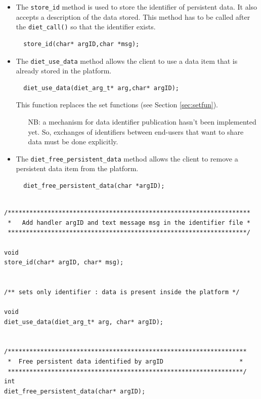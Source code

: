 \begin{itemize}
\item {The \texttt{store\_id} method} is used to store the
identifier of persistent data. It also accepts a description of
the data stored. This method has to be called after the
\texttt{diet\_call()} so that the identifier exists.
\begin{verbatim}
  store_id(char* argID,char *msg);
\end{verbatim}

\item The \texttt{diet\_use\_data} method allows the client to use a data
item that is already stored in the platform.
\begin{verbatim}
  diet_use_data(diet_arg_t* arg,char* argID);
\end{verbatim}
This function replaces the set functions (see Section \ref{sec:setfun}).



\begin{itemize}
\item[NB:] a mechanism for data identifier publication hasn't been 
implemented yet. So, exchanges of identifiers between end-users that
want to share data must be done explicitly.
\end{itemize}



\item {The \texttt{diet\_free\_persistent\_data} method} allows the
client to remove a persistent data item from the platform.
\begin{verbatim}
  diet_free_persistent_data(char *argID);
\end{verbatim}

\end{itemize}


{\footnotesize
\begin{verbatim}

/*******************************************************************
 *   Add handler argID and text message msg in the identifier file *
 ******************************************************************/

void 
store_id(char* argID, char* msg);


/** sets only identifier : data is present inside the platform */

void
diet_use_data(diet_arg_t* arg, char* argID);


/******************************************************************
 *  Free persistent data identified by argID                     *
 *****************************************************************/
int
diet_free_persistent_data(char* argID);

\end{verbatim}
}


